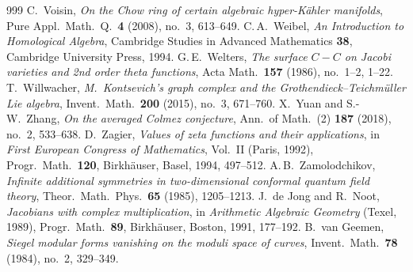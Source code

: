\begin{thebibliography}{999}
 C.~Voisin, \emph{On the Chow ring of certain algebraic hyper-K\"ahler manifolds}, Pure Appl.\ Math.\ Q.\ \textbf{4} (2008), no.~3, 613--649.
 C.\,A.~Weibel, \emph{An Introduction to Homological Algebra}, Cambridge Studies in Advanced Mathematics \textbf{38}, Cambridge University Press, 1994. %
 G.\,E.~Welters, \emph{The surface $C-C$ on Jacobi varieties and 2nd order theta functions}, Acta Math.\ \textbf{157} (1986), no.~1--2, 1--22.
 T.~Willwacher, \emph{M.\ Kontsevich's graph complex and the Grothendieck--Teichm\"uller Lie algebra}, Invent.\ Math.\ \textbf{200} (2015), no.~3, 671--760. %
 X.~Yuan and S.-W.~Zhang, \emph{On the averaged Colmez conjecture}, Ann.\ of Math.\ (2) \textbf{187} (2018), no.~2, 533--638.
 D.~Zagier, \emph{Values of zeta functions and their applications}, in \emph{First European Congress of Mathematics}, Vol.~II (Paris, 1992), Progr.\ Math.\ \textbf{120}, Birkh\"auser, Basel, 1994, 497--512. %
 A.\,B.~Zamolodchikov, \emph{Infinite additional symmetries in two-dimensional conformal quantum field theory}, Theor.\ Math.\ Phys.\ \textbf{65} (1985), 1205--1213. %
 J.~de Jong and R.~Noot, \emph{Jacobians with complex multiplication}, in \emph{Arithmetic Algebraic Geometry} (Texel, 1989), Progr.\ Math.\ \textbf{89}, Birkh\"auser, Boston, 1991, 177--192.
 B.~van Geemen, \emph{Siegel modular forms vanishing on the moduli space of curves}, Invent.\ Math.\ \textbf{78} (1984), no.~2, 329--349.

\end{thebibliography}
